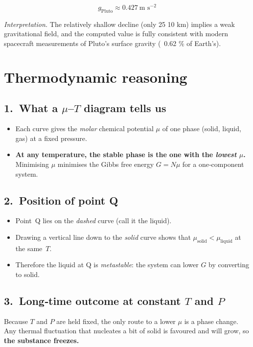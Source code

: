 \documentclass[12pt]{article}
\theoremstyle{definition} %
\theoremstyle{plain} %
\begin{document}
\[
\boxed{g_{\text{Pluto}} \approx 0.427\ \text{m s}^{-2}}
\]

\bigskip
\noindent
\emph{Interpretation.}  
The relatively shallow decline (only 25 %
10 km) implies a weak gravitational field, and the computed value is
fully consistent with modern spacecraft measurements of Pluto’s surface
gravity (~0.62 \% of Earth’s).

\section*{Thermodynamic reasoning}

\subsection*{1.\ What a $\mu$--$T$ diagram tells us}
\begin{itemize}
  \item Each curve gives the \emph{molar} chemical potential $\mu$ of one
        phase (solid, liquid, gas) at a fixed pressure.
  \item \textbf{At any temperature, the stable phase is the one with the
        \emph{lowest} $\mu$.}\;%
        Minimising $\mu$ minimises the Gibbs free energy
        $G = N\mu$ for a one‑component system.
\end{itemize}

\subsection*{2.\ Position of point Q}
\begin{itemize}
  \item Point~Q lies on the \emph{dashed} curve (call it the liquid).
  \item Drawing a vertical line down to the \emph{solid} curve shows that
        $\mu_{\text{solid}} < \mu_{\text{liquid}}$ at the same~$T$.
  \item Therefore the liquid at Q is \emph{metastable}: the system can
        lower $G$ by converting to solid.
\end{itemize}

\subsection*{3.\ Long‑time outcome at constant $T$ and $P$}
Because $T$ and $P$ are held fixed,
the only route to a lower $\mu$ is a phase change.
Any thermal fluctuation that nucleates a bit of solid is favoured and
will grow, so \textbf{the substance freezes.}
\end{document}
